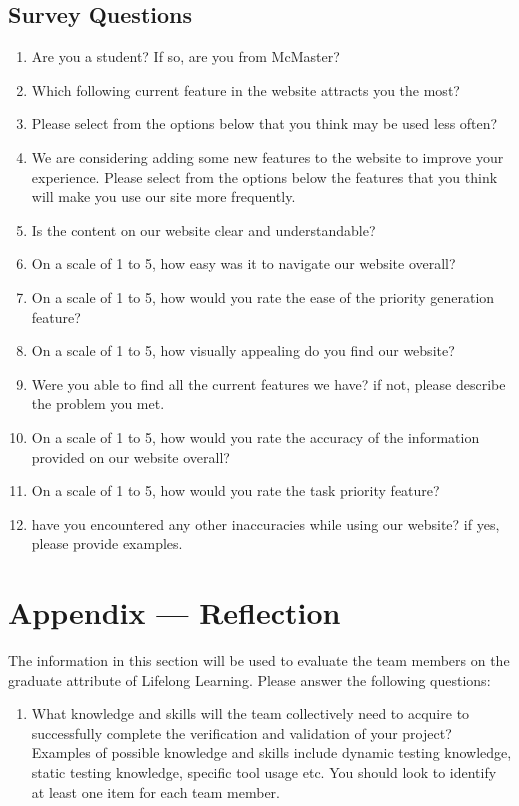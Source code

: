 \documentclass[12pt, titlepage]{article}
\begin{document}
\begin{enumerate}
\begin{longtable}{|l|l|l|p{5cm}|}
\hline
\end{longtable}

\subsection{Survey Questions}

\begin{enumerate}
  \item Are you a student? If so, are you from McMaster?
  \item Which following current feature in the website attracts you the most?
  \item Please select from the options below that you think may be used less often?
  \item We are considering adding some new features to the website to improve your experience. Please select from the options below the features that you think will make you use our site more frequently.
  \item Is the content on our website clear and understandable?
  \item On a scale of 1 to 5, how easy was it to navigate our website overall?
  \item On a scale of 1 to 5, how would you rate the ease of the priority generation feature?
  \item On a scale of 1 to 5, how visually appealing do you find our website?
  \item Were you able to find all the current features we have? if not, please describe the problem you met.
  \item On a scale of 1 to 5, how would you rate the accuracy of the information provided on our website overall?
  \item On a scale of 1 to 5, how would you rate the task priority feature?
  \item have you encountered any other inaccuracies while using our website? if yes, please provide examples.
\end{enumerate}

\newpage{}
\section*{Appendix --- Reflection}


The information in this section will be used to evaluate the team members on the
graduate attribute of Lifelong Learning.  Please answer the following questions:

\begin{enumerate}
  \item What knowledge and skills will the team collectively need to acquire to
  successfully complete the verification and validation of your project?
  Examples of possible knowledge and skills include dynamic testing knowledge,
  static testing knowledge, specific tool usage etc.  You should look to
  identify at least one item for each team member.



\end{enumerate}
\end{enumerate}
\end{document}
